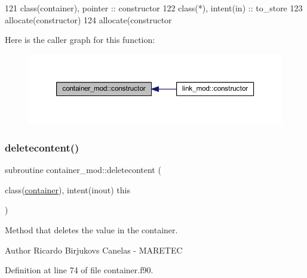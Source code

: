\begin{DoxyCode}
121     \textcolor{keywordtype}{class}(container), \textcolor{keywordtype}{pointer} :: constructor
122     \textcolor{keywordtype}{class}(*), \textcolor{keywordtype}{intent(in)} :: to\_store
123     \textcolor{keyword}{allocate}(constructor)
124     \textcolor{keyword}{allocate}(constructor%
\end{DoxyCode}
Here is the caller graph for this function\+:\nopagebreak
\begin{figure}[H]
\begin{center}
\leavevmode
\includegraphics[width=350pt]{namespacecontainer__mod_a6262df4ff34024d566cf8261dc20a248_icgraph}
\end{center}
\end{figure}
\mbox{\label{namespacecontainer__mod_a005e6cba51f5837a8bef1f05bb899c08}} 
\subsubsection{\texorpdfstring{deletecontent()}{deletecontent()}}
{\footnotesize\ttfamily subroutine container\+\_\+mod\+::deletecontent (\begin{DoxyParamCaption}\item[{class(\mbox{\hyperlink{structcontainer__mod_1_1container}{container}}), intent(inout)}]{this }\end{DoxyParamCaption})\hspace{0.3cm}{\ttfamily [private]}}



Method that deletes the value in the container. 

\begin{DoxyAuthor}{Author}
Ricardo Birjukovs Canelas -\/ M\+A\+R\+E\+T\+EC 
\end{DoxyAuthor}


Definition at line 74 of file container.\+f90.


